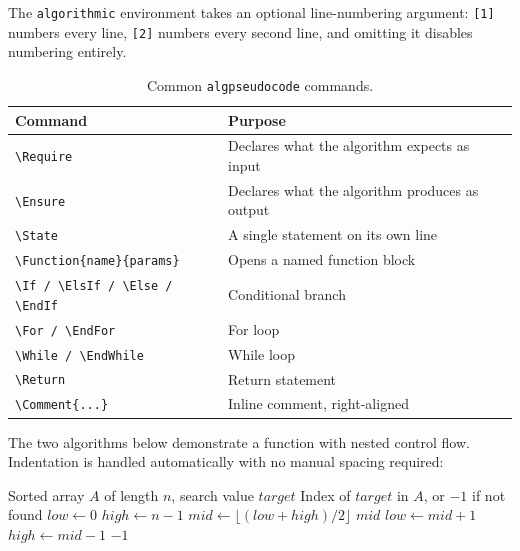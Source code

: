 The \texttt{algorithmic} environment takes an optional line-numbering argument: \texttt{[1]} numbers every line, \texttt{[2]} numbers every second line, and omitting it disables numbering entirely.

\begin{table}[H]
	\centering
	\caption{Common \texttt{algpseudocode} commands.}
	\label{tab:algpseudocode}
	\begin{tabularx}{\linewidth}{@{}lX@{}}
		\toprule
		Command & Purpose \\
		\midrule
		\texttt{\textbackslash Require} & Declares what the algorithm expects as input \\
		\texttt{\textbackslash Ensure}  & Declares what the algorithm produces as output \\
		\texttt{\textbackslash State}   & A single statement on its own line \\
		\texttt{\textbackslash Function\{name\}\{params\}} & Opens a named function block \\
		\texttt{\textbackslash If / \textbackslash ElsIf / \textbackslash Else / \textbackslash EndIf} & Conditional branch \\
		\texttt{\textbackslash For / \textbackslash EndFor} & For loop \\
		\texttt{\textbackslash While / \textbackslash EndWhile} & While loop \\
		\texttt{\textbackslash Return} & Return statement \\
		\texttt{\textbackslash Comment\{...\}} & Inline comment, right-aligned \\
		\bottomrule
	\end{tabularx}
\end{table}

The two algorithms below demonstrate a function with nested control flow. Indentation is handled automatically with no manual spacing required:

\begin{algorithm}[H]
	\caption{Binary Search}
	\label{alg:binarysearch}
	\begin{algorithmic}[1]
		\Require Sorted array $A$ of length $n$, search value $target$
		\Ensure Index of $target$ in $A$, or $-1$ if not found
		\State $low \gets 0$
		\State $high \gets n - 1$
		\State $mid \gets \lfloor(low + high) / 2\rfloor$ 
		\State \Return $mid$ 
		\State $low \gets mid + 1$ 
		\Else
		\State $high \gets mid - 1$ 
		\EndIf
		\EndWhile
		\State \Return $-1$ 
		\EndFunction
	\end{algorithmic}
\end{algorithm}

